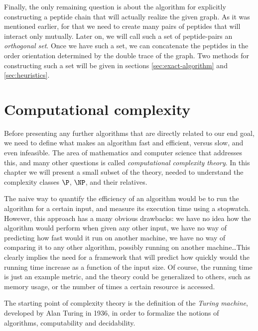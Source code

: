 \documentclass[12pt,a4paper,titlepage,openany]{report}
\begin{document}
Finally, the only remaining question is about the algorithm for explicitly constructing a peptide chain that will actually realize the given graph. As it was mentioned earlier, for that we need to create many pairs of peptides that will interact only mutually. Later on, we will call such a set of peptide-pairs an \emph{orthogonal set}. Once we have such a set, we can concatenate the peptides in the order orientation determined by the double trace of the graph. Two methods for constructing such a set will be given in sections \ref{sec:exact-algorithm} and \ref{sec:heuristics}.

\chapter{Computational complexity}
\thispagestyle{fancy}
\label{chap:Computational complexity}

Before presenting any further algorithms that are directly related to our end goal, we need to define what makes an algorithm fast and efficient, versus slow, and even infeasible. The area of mathematics and computer science that addresses this, and many other questions is called \emph{computational complexity theory}. In this chapter we will present a small subset of the theory, needed to understand the complexity classes $\P$, $\NP$, and their relatives.  

The naive way to quantify the efficiency of an algorithm would be to run the algorithm for a certain input, and measure its execution time using a stopwatch. However, this approach has a many obvious drawbacks: we have no idea how the algorithm would perform when given any other input, we have no way of predicting how fast would it run on another machine, we have no way of comparing it to any other algorithm, possibly running on another machine\dots This clearly implies the need for a framework that will predict how quickly would the running time increase as a function of the input size. Of course, the running time is just an example metric, and the theory could be generalized to others, such as memory usage, or the number of times a certain resource is accessed.

The starting point of complexity theory is the definition of the \emph{Turing machine}, developed by Alan Turing in 1936, in order to formalize the notions of algorithms, computability and decidability.
\end{document}
